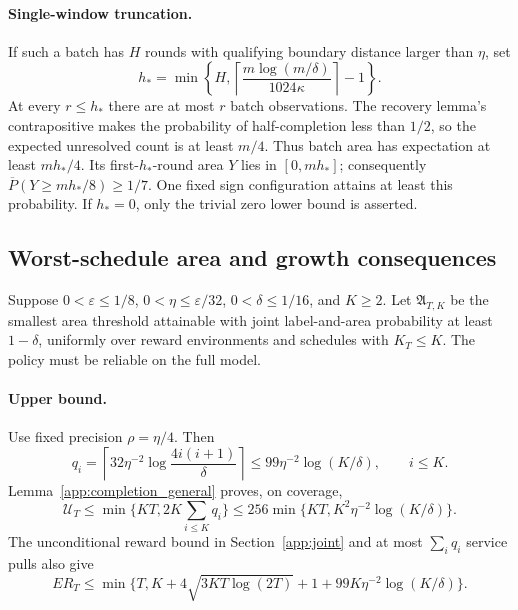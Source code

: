 \documentclass[11pt]{article}
\theoremstyle{remark}
\begin{document}
\paragraph{Single-window truncation.}
If such a batch has $H$ rounds with qualifying boundary distance larger than
$\eta$, set
\[
 h_* =\min\left\{H,
 \left\lceil\frac{m\log(m/\delta)}{1024\kappa}\right\rceil-1\right\}.
\]
At every $r\le h_*$ there are at most $r$ batch observations. The recovery
lemma's contrapositive makes the probability of half-completion less than
$1/2$, so the expected unresolved count is at least $m/4$. Thus batch area
has expectation at least $mh_*/4$. Its first-$h_*$-round area $Y$ lies in
$[0,mh_*]$; consequently
$\overline P(Y\ge mh_*/8)\ge1/7$. One fixed sign configuration attains
at least this probability. If $h_*=0$, only the trivial zero lower bound is
asserted.

\subsection{Worst-schedule area and growth consequences}
\label{app:worst_area}

Suppose $0<\varepsilon\le1/8$, $0<\eta\le\varepsilon/32$,
$0<\delta\le1/16$, and $K\ge2$. Let $\mathfrak A_{T,K}$ be the smallest
area threshold attainable with joint label-and-area probability at least
$1-\delta$, uniformly over reward environments and schedules with $K_T\le K$.
The policy must be reliable on the full model.

\paragraph{Upper bound.}
Use fixed precision $\rho=\eta/4$. Then
\[
 q_i=\left\lceil32\eta^{-2}\log\frac{4i(i+1)}\delta\right\rceil
 \le99\eta^{-2}\log(K/\delta),\qquad i\le K.
\]
Lemma~\ref{app:completion_general} proves, on coverage,
\[
 \mathcal U_T\le\min\{KT,2K\sum_{i\le K}q_i\}
 \le256\min\{KT,K^2\eta^{-2}\log(K/\delta)\}.
\]
The unconditional reward bound in Section~\ref{app:joint} and at most $\sum_iq_i$ service pulls also give
\[
 ER_T\le\min\{T,K+4\sqrt{3KT\log(2T)}+1+
                  99K\eta^{-2}\log(K/\delta)\}.
\]
\end{document}
